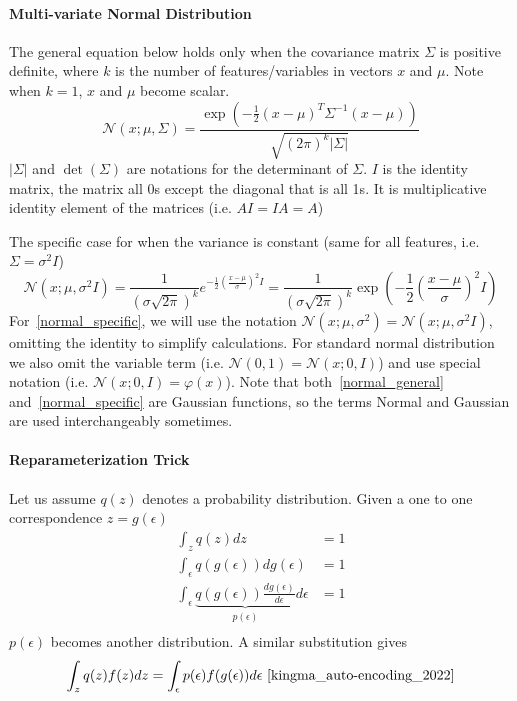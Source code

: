 \documentclass{article}
\numberwithin{equation}{subsection}
\begin{document}
\paragraph{Multi-variate Normal Distribution}
The general equation below holds only when the covariance matrix $\Sigma$ is positive definite, where $k$ is the number of features/variables in vectors $x$ and $\mu$. Note when $k=1$, $x$ and $\mu$ become scalar.
\begin{equation}
    \mathcal{N}(x; \mu, \Sigma)=\frac {\exp \left(-{\frac {1}{2}}\left(x-\mu\right)^T\Sigma^{-1}\left(x-\mu\right)\right)}{\sqrt {(2\pi )^{k}|\Sigma|}}
    \label{normal_general}
\end{equation}
$|\Sigma|$ and $\det(\Sigma)$ are notations for the determinant of $\Sigma$. $I$ is the identity matrix, the matrix all 0s except the diagonal that is all 1s. It is multiplicative identity element of the matrices (i.e. $AI = IA = A$)

The specific case for when the variance is constant (same for all features, i.e. $\Sigma = \sigma^2 I$)
\begin{equation}
    \mathcal{N}(x; \mu, \sigma^2I)=\frac {1}{(\sigma\sqrt{2\pi})^k} e^{-{\frac {1}{2}}\left(\frac {x-\mu}{\sigma}\right)^2 I}=\frac {1}{(\sigma\sqrt{2\pi})^k} \exp\left(-{\frac {1}{2}}\left(\frac {x-\mu}{\sigma}\right)^2 I\right) \label{normal_specific}
\end{equation}
For~\ref{normal_specific}, we will use the notation $\mathcal{N}(x; \mu, \sigma^2) = \mathcal{N}(x; \mu, \sigma^2I)$, omitting the identity to simplify calculations. For standard normal distribution we also omit the variable term (i.e. $\mathcal{N}(0, 1)=\mathcal{N}(x; 0, I)$) and use special notation (i.e. $\mathcal{N}(x; 0, I)=\mathcal{\varphi}(x)$). Note that both~\ref{normal_general} and~\ref{normal_specific} are Gaussian functions, so the terms Normal and Gaussian are used interchangeably sometimes.
\paragraph{Reparameterization Trick}
\label{reparam_trick}
Let us assume $q(z)$ denotes a probability distribution. Given a one to one correspondence $z = g(\epsilon)$
\begin{align}
    \int_z q(z)dz &= 1\\
    \int_\epsilon q(g(\epsilon))dg(\epsilon) &= 1\\
    \int_\epsilon \underbrace{q(g(\epsilon))\frac{dg(\epsilon)}{d\epsilon}}_{p(\epsilon)}d\epsilon &= 1\\
\end{align}
$p(\epsilon)$ becomes another distribution. A similar substitution gives
\begin{equation}
    \int_z q(z)f(z)dz = \int_\epsilon p(\epsilon)f(g(\epsilon))d\epsilon~\cite{kingma_auto-encoding_2022}
\end{equation}
\end{document}

